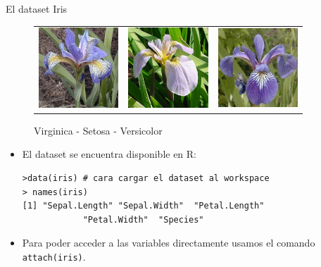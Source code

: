 \documentclass[handout]{beamer}
\begin{document}
\begin{frame}[fragile]{El dataset Iris}
\scriptsize{


 \begin{figure}[h!]
\begin{center}
\begin{tabular}{ccc}
 \includegraphics[width=3cm]{pics/virginica.jpg}
&
\includegraphics[width=3cm]{pics/setosa.jpg}
&
\includegraphics[width=3cm]{pics/versicolor.jpg}
\end{tabular}
\caption{Virginica - Setosa - Versicolor}
\end{center}
\end{figure}

\begin{itemize}
 \item El dataset se encuentra disponible en R:
 \begin{verbatim}
>data(iris) # cara cargar el dataset al workspace
> names(iris)
[1] "Sepal.Length" "Sepal.Width"  "Petal.Length" 
		    "Petal.Width"  "Species"     
 \end{verbatim}

 \item Para poder acceder a las variables directamente usamos el comando \verb+attach(iris)+.
 
 
\end{itemize}



}

\end{frame}
\end{document}
